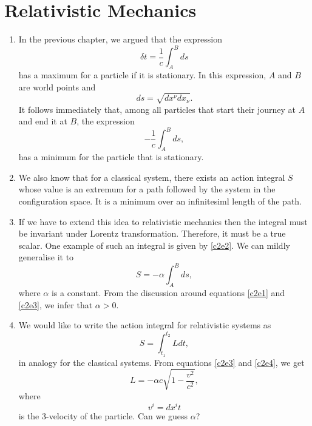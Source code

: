 \chapter{Relativistic Mechanics}\label{c2}
\begin{enumerate}
\item In the previous chapter, we argued that the expression
\begin{equation}\label{c2e1}
\delta t = \frac{1}{c}\int_A^B ds
\end{equation}
has a maximum for a particle if it is stationary. In this expression, $A$ and 
$B$ are world points and 
\[
ds = \sqrt{dx^\nu dx_\nu}.
\]
It follows immediately that, among all particles that start their journey at 
$A$ and end it at $B$, the expression
\begin{equation}\label{c2e2}
-\frac{1}{c}\int_A^B ds,
\end{equation}
has a minimum for the particle that is stationary.

\item We also know that for a classical system, there exists an action integral
$S$ whose value is an extremum for a path followed by the system in the 
configuration space. It is a minimum over an infinitesiml length of the path.

\item If we have to extend this idea to relativistic mechanics then the integral
must be invariant under Lorentz transformation. Therefore, it must be a true scalar.
One example of such an integral is given by \eqref{c2e2}. We can mildly generalise
it to
\begin{equation}\label{c2e3}
S = -\alpha \int_A^B ds,
\end{equation}
where $\alpha$ is a constant. From the discussion around equations \eqref{c2e1}
and \eqref{c2e3}, we infer that $\alpha > 0$.

\item We would like to write the action integral for relativistic systems as
\begin{equation}\label{c2e4}
S = \int_{t_1}^{t_2}Ldt,
\end{equation}
in analogy for the classical systems. From equations \eqref{c2e3} and 
\eqref{c2e4}, we get
\begin{equation}\label{c2e5}
L = -\alpha c\sqrt{1 - \frac{v^2}{c^2}},
\end{equation}
where
\[
v^i = d{x^i}{t}
\]
is the 3-velocity of the particle. Can we guess $\alpha$?


\end{enumerate}
